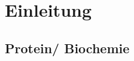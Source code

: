 \documentclass[german,version-2022-01]{uzl-thesis}
\begin{document}
%
%


\chapter{Einleitung}


%
\section{Protein/ Biochemie}
\end{document}
